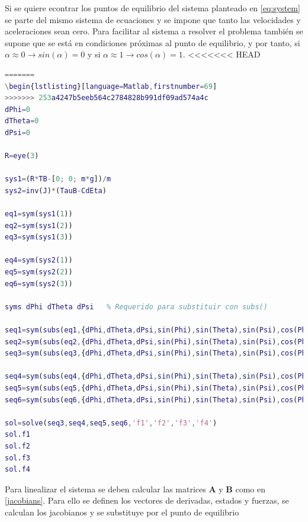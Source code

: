 \documentclass[twoside,11pt]{report}
\begin{document}
\onehalfspacing
Si se quiere econtrar los puntos de equilibrio del sistema planteado en \ref{eq:system} se parte del mismo sistema de ecuaciones y se impone que tanto las velocidades y aceleraciones sean cero. 
Para facilitar al sistema a resolver el problema también se supone que se está en condiciones próximas al punto de equilibrio, y por tanto, si  $\alpha \approx 0 \rightarrow sin(\alpha)=0$ y si $\alpha \approx 1 \rightarrow cos(\alpha)=1$.
\singlespacing
<<<<<<< HEAD
\begin{lstlisting}[language=Matlab,firstnumber=68]
=======
\begin{lstlisting}[language=Matlab,firstnumber=69]
>>>>>>> 253a4247b5eeb564c2784828b991df09ad574a4c
dPhi=0
dTheta=0
dPsi=0

R=eye(3)

sys1=(R*TB-[0; 0; m*g])/m
sys2=inv(J)*(TauB-CdEta)

eq1=sym(sys1(1))
eq2=sym(sys1(2))
eq3=sym(sys1(3))

eq4=sym(sys2(1))
eq5=sym(sys2(2))
eq6=sym(sys2(3))

syms dPhi dTheta dPsi 	% Requerido para substituir con subs()

seq1=sym(subs(eq1,{dPhi,dTheta,dPsi,sin(Phi),sin(Theta),sin(Psi),cos(Phi),cos(Theta),cos(Psi)},{0,0,0,0,0,0,1,1,1}))
seq2=sym(subs(eq2,{dPhi,dTheta,dPsi,sin(Phi),sin(Theta),sin(Psi),cos(Phi),cos(Theta),cos(Psi)},{0,0,0,0,0,0,1,1,1}))
seq3=sym(subs(eq3,{dPhi,dTheta,dPsi,sin(Phi),sin(Theta),sin(Psi),cos(Phi),cos(Theta),cos(Psi)},{0,0,0,0,0,0,1,1,1}))

seq4=sym(subs(eq4,{dPhi,dTheta,dPsi,sin(Phi),sin(Theta),sin(Psi),cos(Phi),cos(Theta),cos(Psi)},{0,0,0,0,0,0,1,1,1}))
seq5=sym(subs(eq5,{dPhi,dTheta,dPsi,sin(Phi),sin(Theta),sin(Psi),cos(Phi),cos(Theta),cos(Psi)},{0,0,0,0,0,0,1,1,1}))
seq6=sym(subs(eq6,{dPhi,dTheta,dPsi,sin(Phi),sin(Theta),sin(Psi),cos(Phi),cos(Theta),cos(Psi)},{0,0,0,0,0,0,1,1,1}))

sol=solve(seq3,seq4,seq5,seq6,'f1','f2','f3','f4')
sol.f1
sol.f2
sol.f3
sol.f4
\end{lstlisting}
\onehalfspacing

Para linealizar el sistema se deben calcular las matrices $\mathbf{A}$ y $\mathbf{B}$ como en  \ref{jacobians}. Para ello se definen los vectores de derivadas, estados y fuerzas, se calculan los jacobianos y se substituye por el punto de equilibrio
\end{document}
